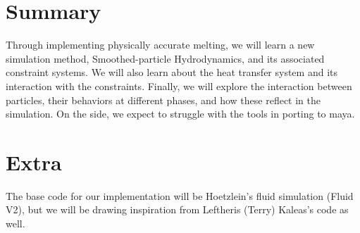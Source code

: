 \documentclass[pdftex,12pt]{article}
\begin{document}
\section{Summary}
Through implementing physically accurate melting, we will learn a new simulation method, Smoothed-particle Hydrodynamics, and its associated constraint systems. We will also learn about the heat transfer system and its interaction with the constraints. Finally, we will explore the interaction between particles, their behaviors at different phases, and how these reflect in the simulation. On the side, we expect to struggle with the tools in porting to maya.

\section{Extra}
The base code for our implementation will be Hoetzlein's fluid simulation (Fluid V2), but we will be drawing inspiration from Leftheris (Terry) Kaleas's code as well. 
\end{document}

